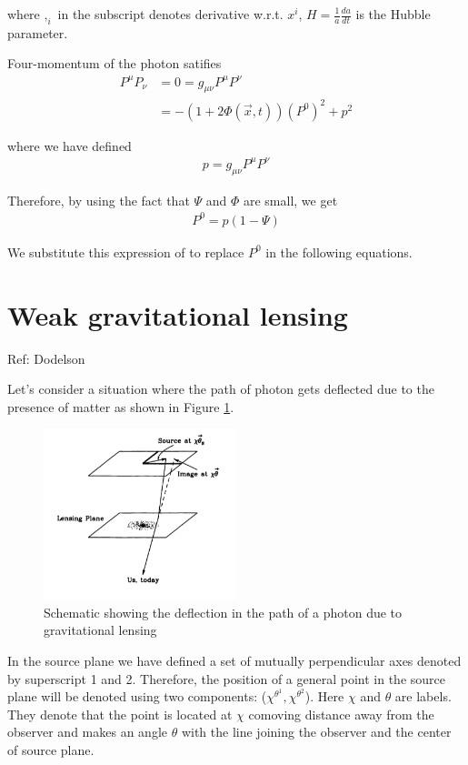 \documentclass[12pt]{article}
\newcommand{\beqa}{\begin{eqnarray}}
\newcommand{\eeqa}{\end{eqnarray}}
\numberwithin{equation}{section}
\begin{document}
where ${,_i}$ in the subscript denotes derivative w.r.t. $x^{i}$, $H =\frac{1}{a} \frac{da}{dt}$ is the Hubble parameter.

Four-momentum of the photon satifies
\begin{equation}
\begin{aligned}
P^{\mu}P_{\nu} & = 0 = g_{\mu \nu} P^{\mu} P^{\nu} \nonumber \\ 
 & = -(1+ 2 \Phi(\vec{x},t)) (P^0)^2 + p^2
\end{aligned}
\end{equation}

where we have defined
\beqa
p = g_{\mu \nu} P^{\mu} P^{\nu}
\eeqa

Therefore, by using the fact that $\Psi$ and $\Phi$ are small, we get
\beqa
P^{0} = p(1 - \Psi)
\eeqa

We substitute this expression of to replace $P^{0}$ in the following equations.
\section{Weak gravitational lensing}
\begin{center}
Ref: Dodelson
\end{center}
Let's consider a situation where the path of photon gets deflected due to the presence of matter as shown in Figure \ref{fig:photon_lensing}. 

\begin{figure}[h]
    \centering
	\includegraphics[width=0.5\textwidth]{photon_lensing}
	\caption{Schematic showing the deflection in the path of a photon due to gravitational lensing }
	\label{fig:photon_lensing}
\end{figure}

In the source plane we have defined a set of mutually perpendicular axes denoted by superscript 1 and 2. Therefore, the position of a general point in the source plane will be denoted using two components: ($\chi^{\theta^1}, \chi^{\theta^2}$). Here $\chi$ and $\theta$ are labels. They denote that the point is located at $\chi$ comoving distance away from the observer and makes an angle $\theta$ with the line joining the observer and the center of source plane.
\end{document}
